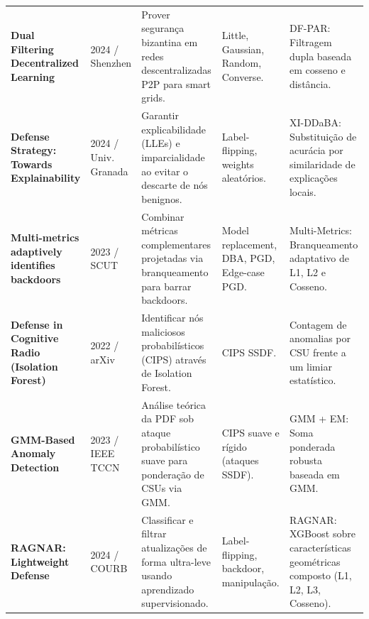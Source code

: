 \documentclass[11pt,a4paper]{article}
\begin{document}
\begin{table}[htbp]
\begin{tabular}{p{3.8cm}p{1.2cm}p{5.5cm}p{2.8cm}p{3.2cm}}
\textbf{Dual Filtering Decentralized Learning} & 2024 / Shenzhen & Prover segurança bizantina em redes descentralizadas P2P para smart grids. & Little, Gaussian, Random, Converse. & DF-PAR: Filtragem dupla baseada em cosseno e distância. \\
\rowcolor{lightbg} \textbf{Defense Strategy: Towards Explainability} & 2024 / Univ. Granada & Garantir explicabilidade (LLEs) e imparcialidade ao evitar o descarte de nós benignos. & Label-flipping, weights aleatórios. & XI-DDaBA: Substituição de acurácia por similaridade de explicações locais. \\
\textbf{Multi-metrics adaptively identifies backdoors} & 2023 / SCUT & Combinar métricas complementares projetadas via branqueamento para barrar backdoors. & Model replacement, DBA, PGD, Edge-case PGD. & Multi-Metrics: Branqueamento adaptativo de L1, L2 e Cosseno. \\
\rowcolor{lightbg} \textbf{Defense in Cognitive Radio (Isolation Forest)} & 2022 / arXiv & Identificar nós maliciosos probabilísticos (CIPS) através de Isolation Forest. & CIPS SSDF. & Contagem de anomalias por CSU frente a um limiar estatístico. \\
\textbf{GMM-Based Anomaly Detection} & 2023 / IEEE TCCN & Análise teórica da PDF sob ataque probabilístico suave para ponderação de CSUs via GMM. & CIPS suave e rígido (ataques SSDF). & GMM + EM: Soma ponderada robusta baseada em GMM. \\
\rowcolor{lightbg} \textbf{RAGNAR: Lightweight Defense} & 2024 / COURB & Classificar e filtrar atualizações de forma ultra-leve usando aprendizado supervisionado. & Label-flipping, backdoor, manipulação. & RAGNAR: XGBoost sobre características geométricas composto (L1, L2, L3, Cosseno). \\
\bottomrule
\end{tabular}
\end{table}
\end{document}
